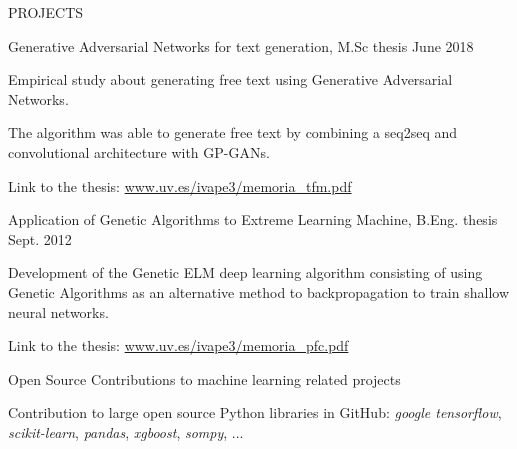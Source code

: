 \documentclass{resume} %
\begin{document}

\begin{rSection}{PROJECTS}

\begin{rSubsection}{Generative Adversarial Networks for text generation, M.Sc thesis}
{June 2018}{}{}  %

\vspace{-3pt}

\item Empirical study about generating free text using Generative Adversarial Networks.
\item The algorithm was able to generate free text by combining a seq2seq and convolutional architecture with GP-GANs.
\item Link to the thesis: \href{https://www.uv.es/ivape3/memoria_tfm.pdf}{www.uv.es/ivape3/memoria\_tfm.pdf}

\end{rSubsection}

\vspace{-6pt}

\begin{rSubsection}{Application of Genetic Algorithms to Extreme Learning Machine, B.Eng. thesis}
{Sept. 2012}{}{}  

\vspace{-3pt}

\item Development of the Genetic ELM deep learning algorithm consisting of using Genetic Algorithms as an alternative method to backpropagation to train shallow neural networks.
\item Link to the thesis: \href{https://www.uv.es/ivape3/memoria_pfc.pdf}{www.uv.es/ivape3/memoria\_pfc.pdf}

\end{rSubsection}

\vspace{-6pt}

\begin{rSubsection}{Open Source Contributions to machine learning related projects}
{}{}{}  

\vspace{-3pt}

\item Contribution to large open source Python libraries in GitHub: \textit{google tensorflow}, \textit{scikit-learn}, \textit{pandas}, \textit{xgboost}, \textit{sompy}, ... 


\end{rSubsection}
\end{rSection}
\end{document}
